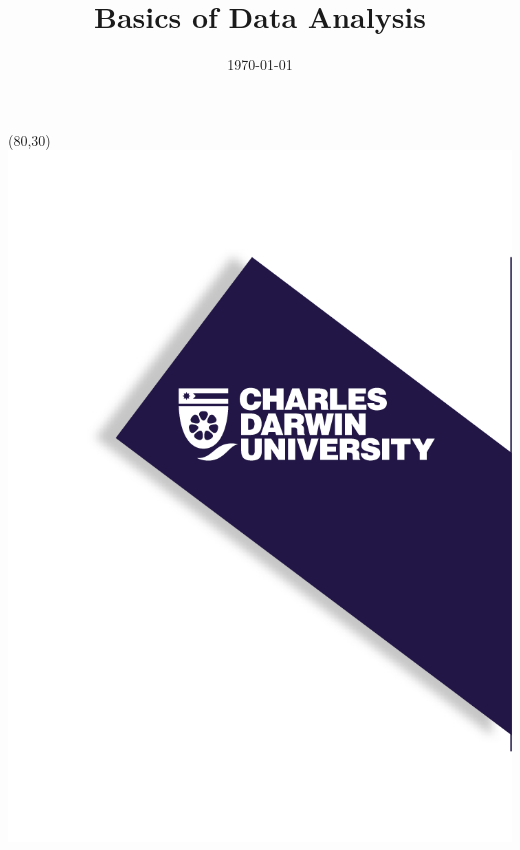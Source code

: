 \documentclass{beamer}
\title[Basics of Data Analysis]{Basics of Data Analysis} %
\author{} %
\institute[Charles Darwin University] %
{
School of Engineering \\ %
\medskip
\textit{} %
}
\date{\today} %
\begin{document}
\begin{frame}
\titlepage %
\begin{textblock}{20}(80,30)
      \includegraphics[scale=0.8]{logo_1.png}
\end{textblock}
\end{frame}


\end{document}
